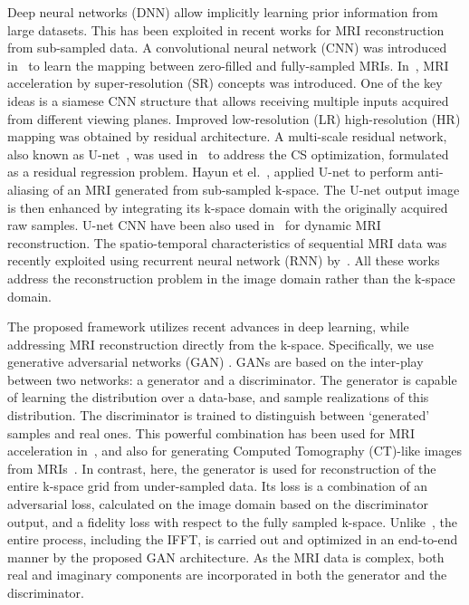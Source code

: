 \documentclass[10pt,journal,compsoc]{IEEEtran}
\begin{document}
Deep neural networks (DNN) allow implicitly learning prior information from large datasets. This has been exploited in recent works for MRI reconstruction from sub-sampled data. A convolutional neural network (CNN) was introduced in~\cite{wang2016accelerating} to learn the mapping between zero-filled and fully-sampled MRIs.
In~\cite{Oktay2016}, MRI acceleration by super-resolution (SR) concepts was introduced. One of the key ideas is a siamese CNN structure that allows receiving multiple inputs acquired from different viewing planes. Improved low-resolution (LR) high-resolution (HR) mapping was obtained by residual architecture.
A multi-scale residual network, also known as U-net~\cite{ronneberger2015u}, was used in~\cite{lee2017deep} to address the CS optimization, formulated as a residual regression problem.
Hayun et el.~\cite{hyun2017deep}, applied U-net to perform anti-aliasing of an MRI generated from sub-sampled k-space. The U-net output image is then enhanced by integrating its k-space domain with the originally acquired raw samples. U-net CNN have been also used in~\cite{sandinodeep} for dynamic MRI reconstruction.
The spatio-temporal characteristics of sequential MRI data was recently exploited using recurrent neural network (RNN) by~\cite{qin2017convolutional}. All these works address the reconstruction problem in the image domain rather than the k-space domain.

The proposed framework utilizes recent advances in deep learning, while addressing MRI reconstruction directly from the k-space. Specifically, we use generative adversarial networks (GAN) \cite{goodfellow2014generative,radford2015unsupervised,pathak2016context}.
GANs are based on the inter-play between two networks: a generator and a discriminator. The generator is capable of learning the distribution over a data-base, and sample realizations of this distribution. 
The discriminator is trained to distinguish between `generated' samples and real ones. This powerful combination has been used for MRI acceleration in~\cite{yu2017deep,mardani2017deep}, and also for generating Computed Tomography (CT)-like images from MRIs~\cite{nie2016medical}.
In contrast, here, the generator is used for reconstruction of the entire k-space grid from under-sampled data. Its loss is a combination of an adversarial loss, calculated on the image domain based on the discriminator output, and a fidelity loss with respect to the fully sampled k-space. Unlike~\cite{hyun2017deep}, the entire process, including the IFFT, is carried out and optimized in an end-to-end manner by the proposed GAN architecture. As the MRI data is complex, both real and imaginary components are incorporated in both the generator and the discriminator. 
\end{document}
